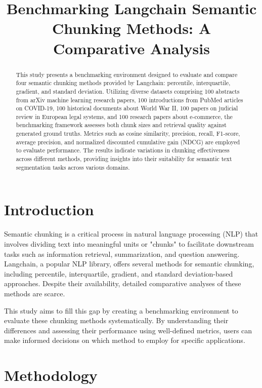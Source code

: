 \documentclass[12pt]{article}
\title{Benchmarking Langchain Semantic Chunking Methods: A Comparative Analysis}
\author{}
\date{}
\begin{document}
\maketitle

\begin{abstract}
This study presents a benchmarking environment designed to evaluate and compare four semantic chunking methods provided by Langchain: percentile, interquartile, gradient, and standard deviation. Utilizing diverse datasets comprising 100 abstracts from arXiv machine learning research papers, 100 introductions from PubMed articles on COVID-19, 100 historical documents about World War II, 100 papers on judicial review in European legal systems, and 100 research papers about e-commerce, the benchmarking framework assesses both chunk sizes and retrieval quality against generated ground truths. Metrics such as cosine similarity, precision, recall, F1-score, average precision, and normalized discounted cumulative gain (NDCG) are employed to evaluate performance. The results indicate variations in chunking effectiveness across different methods, providing insights into their suitability for semantic text segmentation tasks across various domains.
\end{abstract}

\section{Introduction}
Semantic chunking is a critical process in natural language processing (NLP) that involves dividing text into meaningful units or "chunks" to facilitate downstream tasks such as information retrieval, summarization, and question answering. Langchain, a popular NLP library, offers several methods for semantic chunking, including percentile, interquartile, gradient, and standard deviation-based approaches. Despite their availability, detailed comparative analyses of these methods are scarce.

This study aims to fill this gap by creating a benchmarking environment to evaluate these chunking methods systematically. By understanding their differences and assessing their performance using well-defined metrics, users can make informed decisions on which method to employ for specific applications.

\section{Methodology}
\end{document}
